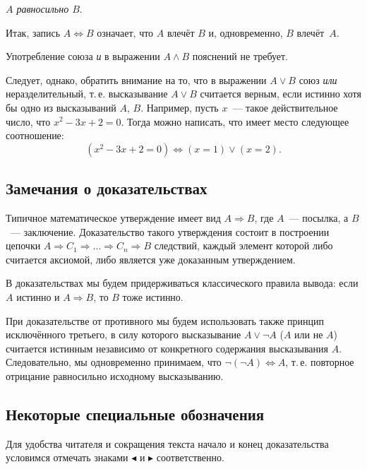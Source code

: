 \emph{$A$ равносильно $B$}.

Итак, запись $A \Leftrightarrow B$ означает, что $A$ влечёт $B$ и, одновременно, $B$ влечёт~$A$.

Употребление союза \emph{и} в выражении $A \land B$ пояснений не требует.

Следует, однако, обратить внимание на то, что в выражении $A \lor B$ союз \emph{или} неразделительный, т.\,е. высказывание $A \lor B$ считается верным, если истинно хотя бы одно из высказываний $A$, $B$. Например, пусть $x$~--- такое действительное число, что $x^2 - 3x + 2 = 0$. Тогда можно написать, что имеет место следующее соотношение:
\[
(x^2 - 3x + 2 = 0) \Leftrightarrow (x = 1) \lor (x = 2).
\]

\subsection{Замечания о доказательствах}

Типичное математическое утверждение имеет вид $A \Rightarrow B$, где $A$~--- посылка, а $B$~--- заключение. Доказательство такого утверждения состоит в построении цепочки $A \Rightarrow C_1 \Rightarrow \ldots \Rightarrow C_n \Rightarrow B$ следствий, каждый элемент которой либо считается аксиомой, либо является уже доказанным утверждением\footnotemark[1].


В доказательствах мы будем придерживаться классического правила вывода: если $A$ истинно и $A \Rightarrow B$, то $B$ тоже истинно.

При доказательстве от противного мы будем использовать также принцип исключённого третьего, в силу которого высказывание $A \lor \neg A$ ($A$ или не $A$) считается истинным независимо от конкретного содержания высказывания $A$. Следовательно, мы одновременно принимаем, что $\neg(\neg A) \Leftrightarrow A$, т.\,е. повторное отрицание равносильно исходному высказыванию.

\subsection{Некоторые специальные обозначения}

Для удобства читателя и сокращения текста начало и конец доказательства условимся отмечать знаками $\blacktriangleleft$ и $\blacktriangleright$ соответственно.

